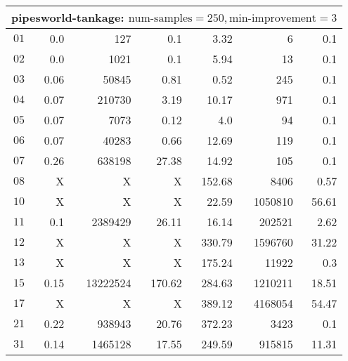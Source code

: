 \begin{longtable}{|c||r|r|r||r|r|r|}
\multicolumn{7}{|l|}{pipesworld-tankage: $\text{num-samples}=250,\text{min-improvement}=3$}\\\hline
$01$ & 0.0 & 127 & 0.1 &3.32 & 6 & 0.1 \\\hline
$02$ & 0.0 & 1021 & 0.1 &5.94 & 13 & 0.1 \\\hline
$03$ & 0.06 & 50845 & 0.81 &0.52 & 245 & 0.1 \\\hline
$04$ & 0.07 & 210730 & 3.19 &10.17 & 971 & 0.1 \\\hline
$05$ & 0.07 & 7073 & 0.12 &4.0 & 94 & 0.1 \\\hline
$06$ & 0.07 & 40283 & 0.66 &12.69 & 119 & 0.1 \\\hline
$07$ & 0.26 & 638198 & 27.38 &14.92 & 105 & 0.1 \\\hline
$08$ & X & X & X &152.68 & 8406 & 0.57 \\\hline
$10$ & X & X & X &22.59 & 1050810 & 56.61 \\\hline
$11$ & 0.1 & 2389429 & 26.11 &16.14 & 202521 & 2.62 \\\hline
$12$ & X & X & X &330.79 & 1596760 & 31.22 \\\hline
$13$ & X & X & X &175.24 & 11922 & 0.3 \\\hline
$15$ & 0.15 & 13222524 & 170.62 &284.63 & 1210211 & 18.51 \\\hline
$17$ & X & X & X &389.12 & 4168054 & 54.47 \\\hline
$21$ & 0.22 & 938943 & 20.76 &372.23 & 3423 & 0.1 \\\hline
$31$ & 0.14 & 1465128 & 17.55 &249.59 & 915815 & 11.31 \\\hline



\end{longtable}
